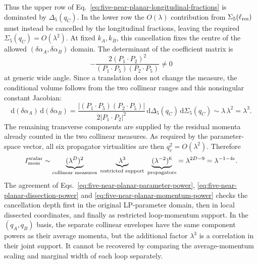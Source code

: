 \documentclass[a4paper,11pt]{article}
\newcommand{\dd}{\mathrm d}
\begin{document}
Thus the upper row of
Eq.~\eqref{eq:five-near-planar-longitudinal-fractions} is dominated by
\(\Delta_5(q_C)\).  In the lower row the \(O(\lambda)\) contribution from
\(\Sigma_5(\ell_{\rm res})\) must instead be cancelled by the longitudinal
fractions, leaving the required
\(\Sigma_5(q_C)=O(\lambda^2)\).  At fixed \(k_A,k_B\), this cancellation
fixes the centre of the allowed \((\delta\alpha_A,\delta\alpha_B)\) domain.
The determinant of the coefficient matrix is
\[
 -\frac{2(P_1\mathbin\cdot P_2)^2}
 {(P_1\mathbin\cdot P_5)
  (P_2\mathbin\cdot P_5)}\ne0
\]
at generic wide angle.  Since a translation does not change the measure, the
conditional volume follows from the two collinear ranges and this
nonsingular constant Jacobian:
\[
 \dd(\delta\alpha_A)\,\dd(\delta\alpha_B)
 =\frac{
 |(P_1\mathbin\cdot P_5)
  (P_2\mathbin\cdot P_5)|}
 {2|P_1\mathbin\cdot P_2|^2}
 \,\dd\Delta_5(q_C)\,\dd\Sigma_5(q_C)
 \sim\lambda\,\lambda^2=\lambda^3.
\]
The remaining transverse components are supplied by the residual momenta
already counted in the two collinear measures.  As required by the
parameter-space vector, all six propagator virtualities are then
\(q_e^2=O(\lambda^2)\).  Therefore
\begin{equation}
 I_{\rm mom}^{\rm scalar}
 \sim
 \underbrace{(\lambda^D)^2}_{\text{collinear measures}}
 \;\underbrace{\lambda^3}_{\text{restricted support}}
 \;\underbrace{(\lambda^{-2})^6}_{\text{propagators}}
 =\lambda^{2D-9}=\lambda^{-1-4\epsilon}.
 \label{eq:five-near-planar-momentum-power}
\end{equation}
The agreement of Eqs.~\eqref{eq:five-near-planar-parameter-power},
\eqref{eq:five-near-planar-dissection-power} and
\eqref{eq:five-near-planar-momentum-power} checks the cancellation depth
first in the original LP-parameter domain, then in local dissected coordinates,
and finally as restricted loop-momentum support.  In the
\((q_A,q_B)\) basis, the separate collinear envelopes have the same component
powers as their average momenta, but the additional factor \(\lambda^3\) is a
correlation in their joint support.  It cannot be recovered by comparing the
average-momentum scaling and marginal width of each loop separately.
\end{document}
